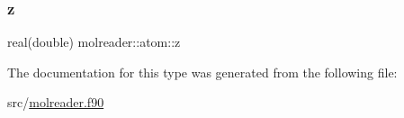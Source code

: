 \mbox{\label{structmolreader_1_1atom_ad68c754042ba9fd277d59c6caf9bc570}} 
\subsubsection{\texorpdfstring{z}{z}}
{\footnotesize\ttfamily real(double) molreader\+::atom\+::z\hspace{0.3cm}{\ttfamily [private]}}



The documentation for this type was generated from the following file\+:\begin{DoxyCompactItemize}
\item 
src/\hyperlink{molreader_8f90}{molreader.\+f90}\end{DoxyCompactItemize}
